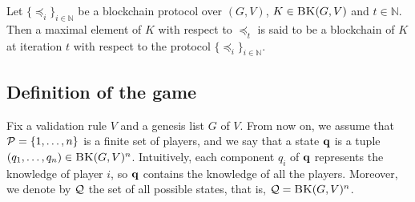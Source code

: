 %


\begin{mydef}
	Let $\{ \preceq_i\}_{i \in \mathbb{N}}$ be a blockchain protocol over $(G,V)$, $K \in \text{\sc BK}(G,V)$ and $t \in \mathbb{N}$. 
	Then a maximal element of $K$ with respect to $\preceq_t$ is said to be a blockchain of $K$ at iteration $t$ with respect to the protocol $\{ \preceq_i\}_{i \in \mathbb{N}}$.
\end{mydef}




\subsection{Definition of the game}

Fix a validation rule $V$ and a genesis list $G$ of $V$. From now on, we assume that $\mathcal{P} = \{1, \ldots, n\}$ is a finite set of players, and we say that a state $\mathbf{q}$ is a tuple $(q_1, \ldots, q_n) \in \text{\sc BK}(G,V)^n$. Intuitively, each component $q_i$ of $\mathbf{q}$ represents the knowledge of player $i$, so $\mathbf{q}$ contains the knowledge of all the players. Moreover, we denote by $\mathcal{Q}$ the set of all possible states, that is, $\mathcal{Q} = \text{\sc BK}(G,V)^n$.


